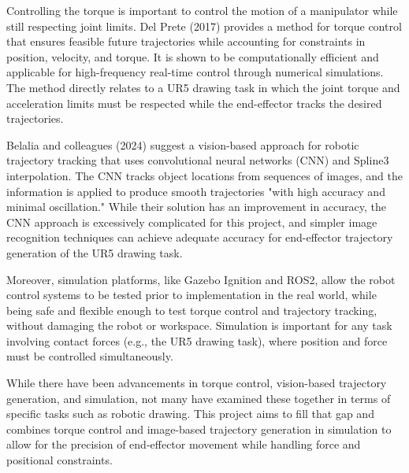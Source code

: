 \documentclass[10pt]{article}
\begin{document}
\begin{hangingpar}

\hspace{0.5cm} 
Controlling the torque is important to control the motion of a manipulator while still respecting joint limits. Del Prete (2017) provides a method for torque control that ensures feasible future trajectories while accounting for constraints in position, velocity, and torque. It is shown to be computationally efficient and applicable for high-frequency real-time control through numerical simulations. The method directly relates to a UR5 drawing task in which the joint torque and acceleration limits must be respected while the end-effector tracks the desired trajectories.

\newpage

\hspace{0.5cm}
Belalia and colleagues (2024) suggest a vision-based approach for robotic trajectory tracking that uses convolutional neural networks (CNN) and Spline3 interpolation. The CNN tracks object locations from sequences of images, and the information is applied to produce smooth trajectories "with high accuracy and minimal oscillation." While their solution has an improvement in accuracy, the CNN approach is excessively complicated for this project, and simpler image recognition techniques can achieve adequate accuracy for end-effector trajectory generation of the UR5 drawing task.

\hspace{0.5cm} 
Moreover, simulation platforms, like Gazebo Ignition and ROS2, allow the robot control systems to be tested prior to implementation in the real world, while being safe and flexible enough to test torque control and trajectory tracking, without damaging the robot or workspace. Simulation is important for any task involving contact forces (e.g., the UR5 drawing task), where position and force must be controlled simultaneously.

\hspace{0.5cm} 
While there have been advancements in torque control, vision-based trajectory generation, and simulation, not many have examined these together in terms of specific tasks such as robotic drawing. This project aims to fill that gap and combines torque control and image-based trajectory generation in simulation to allow for the precision of end-effector movement while handling force and positional constraints.

\end{hangingpar}
\end{document}

